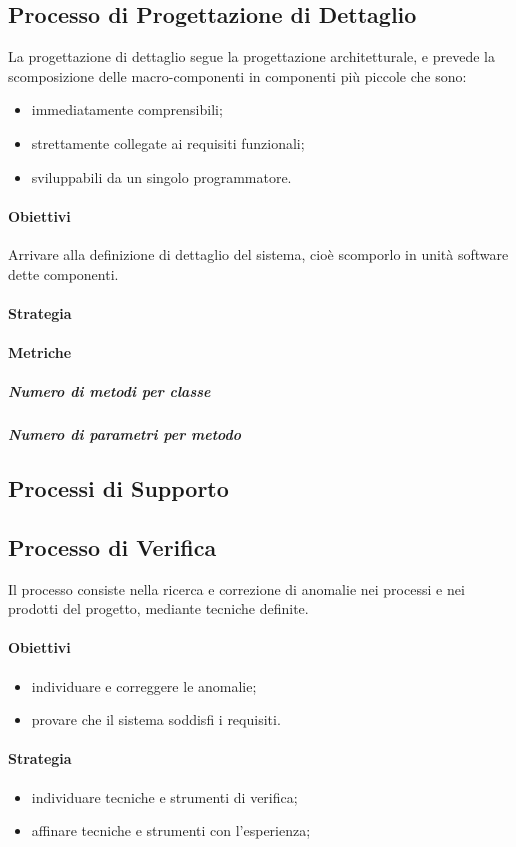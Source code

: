 	\subsection{Processo di Progettazione di Dettaglio}
	La progettazione di dettaglio segue la progettazione architetturale, e prevede la scomposizione delle macro-componenti in componenti più piccole che sono:
	\begin{itemize}
		\item immediatamente comprensibili;
		\item strettamente collegate ai requisiti funzionali;
		\item sviluppabili da un singolo programmatore.
	\end{itemize}
		\paragraph{Obiettivi}
		Arrivare alla definizione di dettaglio del sistema, cioè scomporlo in unità software dette componenti.
		\paragraph{Strategia}
		\paragraph{Metriche}
			\subparagraph{Numero di metodi per classe}
			\subparagraph{Numero di parametri per metodo}
		
\subsection{Processi di Supporto}
	\subsection{Processo di Verifica}
	Il processo consiste nella ricerca e correzione di anomalie nei processi e nei prodotti del progetto, mediante tecniche definite.
		\paragraph{Obiettivi}
		\begin{itemize}
			\item individuare e correggere le anomalie;
			\item provare che il sistema soddisfi i requisiti.
		\end{itemize}	
		\paragraph{Strategia}
		\begin{itemize}
			\item individuare tecniche e strumenti di verifica;
			\item affinare tecniche e strumenti con l'esperienza;
		\end{itemize}	
